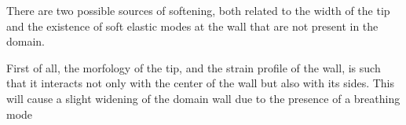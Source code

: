 

There are two possible sources of softening, both related to the width of the tip and the existence of soft elastic modes at the wall that are not present in the domain.

First of all, the morfology of the tip, and the strain profile of the wall, is such that it interacts not only with the center of the wall but also with its sides.
This will cause a slight widening of the domain wall due to the presence of a breathing mode




